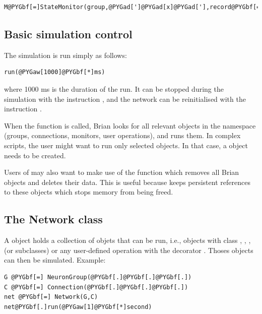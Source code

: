 \documentclass[letterpaper,10pt,english]{manual}
\begin{document}
\begin{Verbatim}[commandchars=@\[\]]
M@PYGbf[=]StateMonitor(group,@PYGad[']@PYGad[x]@PYGad['],record@PYGbf[=]@PYGaA[True],when@PYGbf[=]@PYGad[']@PYGad[before@_resets]@PYGad['])
\end{Verbatim}


\subsection{Basic simulation control}

The simulation is run simply as follows:

\begin{Verbatim}[commandchars=@\[\]]
run(@PYGaw[1000]@PYGbf[*]ms)
\end{Verbatim}

where 1000 ms is the duration of the run. It can be stopped during the simulation with the instruction
, and the network can be reinitialised with the instruction .

When the \hyperlink{brian.run}{} function is called, Brian looks for all relevant
objects in the namespace (groups, connections, monitors, user operations), and runs them.
In complex scripts, the user might want to run only selected objects. In that case, a \hyperlink{brian.Network}{} object
needs to be created.

Users of  may also want to make use of the \hyperlink{brian.clear}{} function which removes all Brian objects
and deletes their data. This is useful because  keeps persistent references to these objects
which stops memory from being freed.


\subsection{The Network class}

A \hyperlink{brian.Network}{} object holds a collection of objets that can be run, i.e., objects with class \hyperlink{brian.NeuronGroup}{},
\hyperlink{brian.Connection}{}, \hyperlink{brian.SpikeMonitor}{}, \hyperlink{brian.StateMonitor}{} (or subclasses) or any user-defined operation with the decorator
\hyperlink{brian.network_operation}{}. Thoses objects can then be simulated. Example:

\begin{Verbatim}[commandchars=@\[\]]
G @PYGbf[=] NeuronGroup(@PYGbf[.]@PYGbf[.]@PYGbf[.])
C @PYGbf[=] Connection(@PYGbf[.]@PYGbf[.]@PYGbf[.])
net @PYGbf[=] Network(G,C)
net@PYGbf[.]run(@PYGaw[1]@PYGbf[*]second)
\end{Verbatim}
\end{document}
